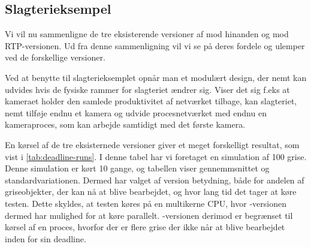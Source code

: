 % 
%  
%  

\subsection{Slagterieksempel}

Vi vil nu sammenligne de tre eksisterende versioner af \PyCSP mod hinanden og mod RTP-versionen. Ud fra denne sammenligning vil vi  se på deres fordele og ulemper ved de forskellige versioner.

Ved at benytte \pycsp til slagterieksemplet opnår man et modulært design, der nemt kan udvides hvis de fysiske rammer for slagteriet ændrer sig. Viser det sig f.eks at kameraet holder den samlede produktivitet af netværket tilbage, kan slagteriet, nemt tilføje endnu et kamera og udvide procesnetværket med endnu en kameraproces, som kan arbejde samtidigt med det første kamera. 

En kørsel af de tre eksisternede versioner giver et meget forskelligt resultat, som vist i \cref{tab:deadline-runs}. I denne tabel har vi foretaget en simulation af 100 grise. Denne simulation er kørt 10 gange, og tabellen viser gennemmsnittet og standardvariationen. Dermed har valget af version betydning, både for andelen af griseobjekter, der kan nå at blive bearbejdet, og hvor lang tid det tager at køre testen. Dette skyldes, at testen køres på en multikerne CPU, hvor -versionen dermed har mulighed for at køre parallelt. -versionen derimod er begrænset til kørsel af en proces, hvorfor der er flere grise der ikke når at blive bearbejdet inden for sin deadline.

